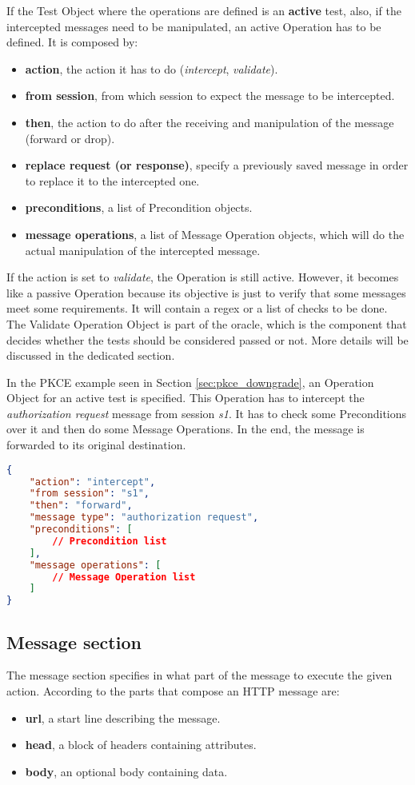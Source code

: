 If the Test Object where the operations are defined is an \textbf{active} test, also, if the intercepted messages need to be manipulated, an active Operation has to be defined. It is composed by:
\begin{itemize}
    \item \textbf{action}, the action it has to do (\textit{intercept}, \textit{validate}).
    \item \textbf{from session}, from which session to expect the message to be intercepted.
    \item \textbf{then}, the action to do after the receiving and manipulation of the message (forward or drop).
    \item \textbf{replace request (or response)}, specify a previously saved message in order to replace it to the intercepted one.
    \item \textbf{preconditions}, a list of Precondition objects.
    \item \textbf{message operations}, a list of Message Operation objects, which will do the actual manipulation of the intercepted message.
\end{itemize}

If the action is set to \textit{validate}, the Operation is still active. However, it becomes like a passive Operation because its objective is just to verify that some messages meet some requirements. It will contain a regex or a list of checks to be done. The Validate Operation Object is part of the oracle, which is the component that decides whether the tests should be considered passed or not. More details will be discussed in the dedicated section.

In the \gls{PKCE} example seen in Section \ref{sec:pkce_downgrade}, an Operation Object for an active test is specified. This Operation has to intercept the \textit{authorization request} message from session \textit{s1}. It has to check some Preconditions over it and then do some Message Operations. In the end, the message is forwarded to its original destination.

\begin{lstlisting}[language=json, caption=Operation definition]
{
    "action": "intercept",
    "from session": "s1",
    "then": "forward",
    "message type": "authorization request",
    "preconditions": [
        // Precondition list
    ],
    "message operations": [
        // Message Operation list
    ]
}
\end{lstlisting}

\subsection{Message section}
The message section specifies in what part of the message to execute the given action.
According to \cite{http} the parts that compose an HTTP message are:
\begin{itemize}
    \item \textbf{url}, a start line describing the message.
    \item \textbf{head}, a block of headers containing attributes.
    \item \textbf{body}, an optional body containing data.
\end{itemize}

